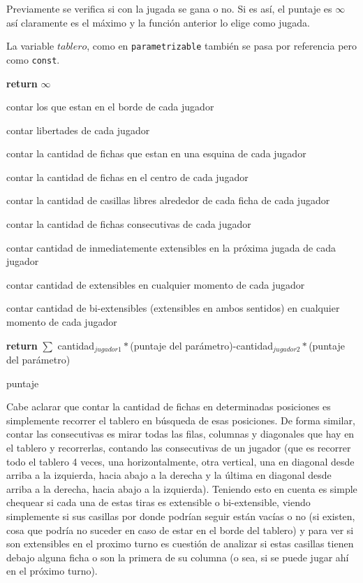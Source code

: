 \documentclass[A4paper,oneside,fleqn,11pt]{article}
\theoremstyle{definition}
\begin{document}
Previamente se verifica si con la jugada se gana o no. Si es así, el puntaje es $\infty$ así claramente es el máximo y la función anterior lo elige como jugada.

La variable $tablero$, como en \texttt{parametrizable} también se pasa por referencia pero como \texttt{const}.
\begin{algorithm}


 

			{
			\textbf{return} $\infty$
			}    	

    	contar los que estan en el borde de cada jugador
    	
    	contar libertades de cada jugador

    	contar la cantidad de fichas que estan en una esquina de cada jugador

    	contar la cantidad de fichas en el centro de cada jugador

		contar la cantidad de casillas libres alrededor de cada ficha de cada jugador

		contar la cantidad de fichas consecutivas de cada jugador

		contar cantidad de inmediatemente extensibles en la próxima jugada de cada jugador

		contar cantidad de  extensibles en cualquier momento de cada jugador

		contar cantidad de  bi-extensibles (extensibles en ambos sentidos) en cualquier momento de cada jugador

		\textbf{return} $\sum$ cantidad$_{jugador1}*$(puntaje del parámetro)-cantidad$_{jugador2}*$(puntaje del parámetro)
		
		
    \caption{puntaje}

\end{algorithm}

Cabe aclarar que contar la cantidad de fichas en determinadas posiciones es simplemente recorrer el tablero en búsqueda de esas posiciones. De forma similar, contar las consecutivas es mirar todas las filas, columnas y diagonales que hay en el tablero y recorrerlas, contando las consecutivas de un jugador (que es recorrer todo el tablero 4 veces, una horizontalmente, otra vertical, una en diagonal desde arriba a la izquierda, hacia abajo a la derecha y la última en diagonal desde arriba a la derecha, hacia abajo a la izquierda). Teniendo esto en cuenta es simple chequear si cada una de estas tiras es extensible o bi-extensible, viendo simplemente si sus casillas por donde podrían seguir están vacías o no (si existen, cosa que podría no suceder en caso de estar en el borde del tablero) y para ver si son extensibles en el proximo turno es cuestión de analizar si estas casillas tienen debajo alguna ficha o son la primera de su columna (o sea, si se puede jugar ahí en el próximo turno).
\end{document}
